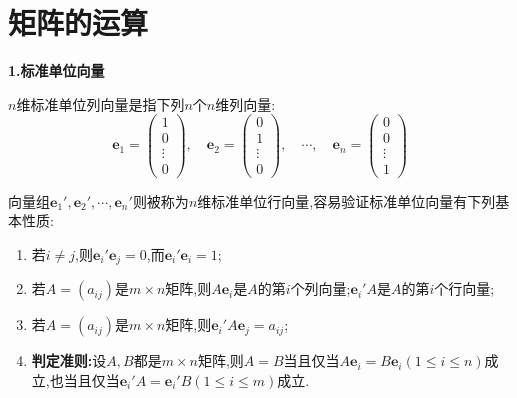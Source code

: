 \documentclass[lang=cn,newtx,10pt,scheme=chinese]{elegantbook}
\begin{document}
\section{矩阵的运算}

\begin{proposition}[标准单位向量和基础矩阵]\label{proposition:标准单位向量和基础矩阵}
\large{\textbf{1.标准单位向量}}

\(n\)维标准单位列向量是指下列\(n\)个\(n\)维列向量:
\[
\boldsymbol{e}_{1}=\left(\begin{array}{c}
1 \\
0 \\
\vdots \\
0
\end{array}\right), \quad \boldsymbol{e}_{2}=\left(\begin{array}{c}
0 \\
1 \\
\vdots \\
0
\end{array}\right), \quad \cdots, \quad \boldsymbol{e}_{n}=\left(\begin{array}{c}
0 \\
0 \\
\vdots \\
1
\end{array}\right)
\]

向量组\(\boldsymbol{e}_{1}', \boldsymbol{e}_{2}', \cdots, \boldsymbol{e}_{n}'\)则被称为\(n\)维标准单位行向量,容易验证标准单位向量有下列基本性质:
\begin{enumerate}
\item 若\(i \neq j\),则\(\boldsymbol{e}_{i}' \boldsymbol{e}_{j}=0\),而\(\boldsymbol{e}_{i}' \boldsymbol{e}_{i}=1\);

\item 若\(A=(a_{ij})\)是\(m\times n\)矩阵,则\(A\boldsymbol{e}_{i}\)是\(A\)的第\(i\)个列向量;\(\boldsymbol{e}_{i}'A\)是\(A\)的第\(i\)个行向量;

\item 若\(A=(a_{ij})\)是\(m\times n\)矩阵,则\(\boldsymbol{e}_{i}'A\boldsymbol{e}_{j}=a_{ij}\);

\item \label{矩阵相等的判定准则}\hypertarget{proposition:矩阵相等的判定法则}{\textbf{判定准则:}}设\(A,B\)都是\(m\times n\)矩阵,则\(A = B\)当且仅当\(A\boldsymbol{e}_{i}=B\boldsymbol{e}_{i}(1\leq i\leq n)\)成立,也当且仅当\(\boldsymbol{e}_{i}'A=\boldsymbol{e}_{i}'B(1\leq i\leq m)\)成立.
\end{enumerate}


\end{proposition}
\end{document}
